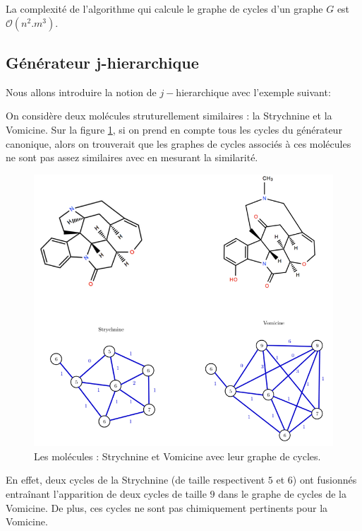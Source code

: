 La complexité de l'algorithme qui calcule le graphe de cycles d'un graphe $G$ est $\mathcal{O}(n^2.m^3)$.


\subsection{Générateur j-hierarchique }

Nous allons introduire la notion de $j-$hierarchique avec l'exemple suivant:

\begin{exemple}
On considère deux molécules struturellement similaires : la Strychnine et la Vomicine. Sur la figure \ref{hierarchiqueexemple}, si on prend en compte tous les cycles du générateur canonique, alors on trouverait que les graphes de cycles associés à ces molécules ne sont pas assez similaires avec en mesurant la similarité. 

\begin{figure}[H]
\label{hierarchiqueexemple}
\begin{center}
\includegraphics[scale=0.85]{j-hierarchique.png}
\end{center}
\caption{Les molécules : Strychnine et Vomicine avec leur graphe de cycles.}
\end{figure}
En effet, deux cycles de la Strychnine (de taille respectivent $5$ et $6$) ont fusionnés entraînant l'apparition de deux cycles de taille $9$ dans le graphe de cycles de la Vomicine. De plus, ces cycles ne sont pas chimiquement pertinents pour la Vomicine.


\end{exemple}
